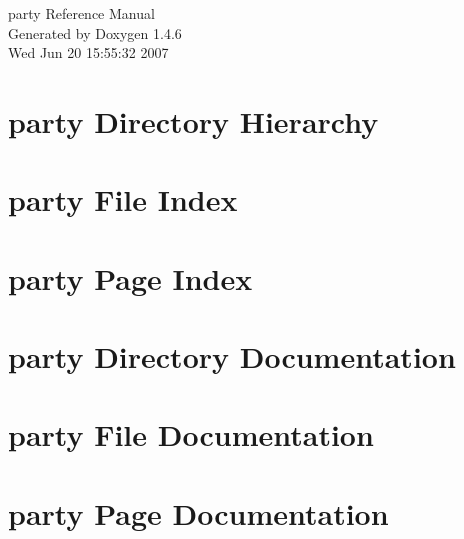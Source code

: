 \documentclass[a4paper]{book}
\begin{document}
\begin{titlepage}
\vspace*{7cm}
\begin{center}
{\Large party Reference Manual}\\
\vspace*{1cm}
{\large Generated by Doxygen 1.4.6}\\
\vspace*{0.5cm}
{\small Wed Jun 20 15:55:32 2007}\\
\end{center}
\end{titlepage}
\clearemptydoublepage
{}
\tableofcontents
\clearemptydoublepage
{}
\chapter{party Directory Hierarchy}

\chapter{party File Index}

\chapter{party Page Index}

\chapter{party Directory Documentation}

\chapter{party File Documentation}





























\chapter{party Page Documentation}

\printindex
\end{document}
